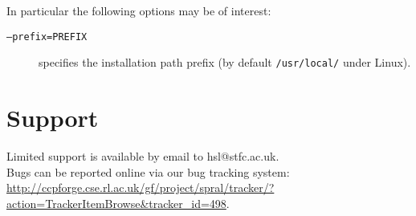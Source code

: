 \documentclass{spral}
\begin{document}
\noindent
In particular the following options may be of interest:
\begin{description}
   \item[\texttt{--prefix=PREFIX}] specifies the installation path prefix (by default \texttt{/usr/local/} under Linux).
\end{description}

\section{Support}
Limited support is available by email to hsl@stfc.ac.uk.\\
Bugs can be reported online via our bug tracking system: \\
\url{http://ccpforge.cse.rl.ac.uk/gf/project/spral/tracker/?action=TrackerItemBrowse&tracker_id=498}.
\end{document}
